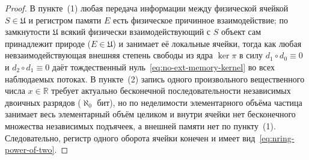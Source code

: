\documentclass[11pt,a4paper]{article}
\theoremstyle{plain}
\theoremstyle{definition}
\begin{document}
\begin{proof}
В пункте~(1) любая передача информации между физической ячейкой $S \in \mathfrak{U}$ и регистром памяти $E$ есть физическое причинное взаимодействие; по замкнутости $\mathfrak{U}$ всякий физически взаимодействующий с $S$ объект сам принадлежит природе ($E \in \mathfrak{U}$) и занимает её локальные ячейки, тогда как любая невзаимодействующая внешняя степень свободы из ядра $\ker\pi$ в силу $d_1\circ d_0 \equiv 0$ и $d_2\circ d_1 \equiv 0$ даёт тождественный нуль~\eqref{eq:no-ext-memory-kernel} во всех наблюдаемых потоках. В пункте~(2) запись одного произвольного вещественного числа $x \in \mathbb{R}$ требует актуально бесконечной последовательности независимых двоичных разрядов ($\aleph_0$ бит), но по неделимости элементарного объёма частица занимает весь элементарный объём целиком и внутри ячейки нет бесконечного множества независимых подъячеек, а внешней памяти нет по пункту~(1). Следовательно, регистр одного оборота ячейки конечен и имеет вид~\eqref{eq:nring-power-of-two}.
\end{proof}
\end{document}
